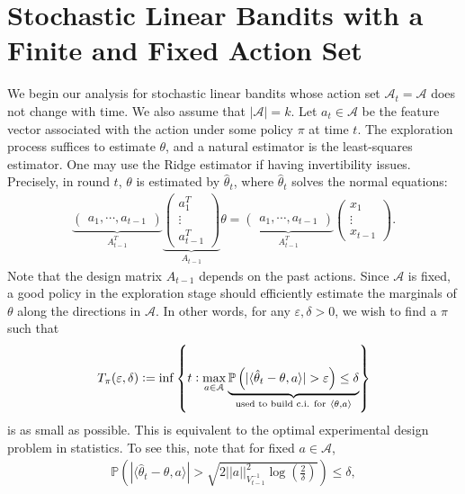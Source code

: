 \documentclass[letterpaper,11pt,openright,openany]{book}
\numberwithin{equation}{section}
\theoremstyle{plain}
\theoremstyle{definition}
\def\P{{\mathbb P}}
\def\e{{\varepsilon}}
\def\t{{\theta}}
\begin{document}
\section{Stochastic Linear Bandits with a Finite and Fixed Action Set}

We begin our analysis for stochastic linear bandits whose action set $\mathcal A_t = \mathcal A$ does not change with time. We also assume that $|\mathcal A|=k$. Let $a_t\in\mathcal A$ be the feature vector associated with the action under some policy $\pi$ at time $t$. The exploration process suffices to estimate $\t$, and a natural estimator is the least-squares estimator. One may use the Ridge estimator if having invertibility issues. Precisely, in round $t$, $\t$ is estimated by $\hat{\t}_t$, where $\hat{\t}_t $ solves the normal equations: 
\begin{align*}
\underbrace{\begin{pmatrix}
a_1, \cdots, a_{t-1}
\end{pmatrix}}_{A^T_{t-1}}\underbrace{\begin{pmatrix}
a_1^T \\
\vdots \\
a_{t-1}^T
\end{pmatrix}}_{A_{t-1}}\t = \underbrace{\begin{pmatrix}
a_1, \cdots, a_{t-1}
\end{pmatrix}}_{A^T_{t-1}}\begin{pmatrix}
x_1 \\
\vdots \\
x_{t-1}
\end{pmatrix}.
\end{align*}
Note that the design matrix $A_{t-1}$ depends on the past actions. Since $\mathcal A$ is fixed, a good policy in the exploration stage should efficiently estimate the marginals of $\t$ along the directions in $\mathcal A$. In other words, for any $\e, \delta>0$, we wish to find a $\pi$ such that 
\begin{align}
T_{\pi}(\e, \delta):=\inf\left\{t: \max_{a\in\mathcal A}\underbrace{\P\left(|\langle\hat{\t}_t-\t, a\rangle|>\e\right)\leq\delta}_{\textcolor{black}{\text{used to build c.i. for}\ \langle\t, a\rangle}}\right\}\label{sl:5}
\end{align}
is as small as possible. This is equivalent to the optimal experimental design problem in statistics. 
To see this, note that for fixed $a\in\mathcal A$, 
\begin{align*}
\P\left(|\langle\hat{\t}_t-\t, a\rangle|>\sqrt{2||a||^2_{V_{t-1}^{-1}}\log\left(\frac{2}{\delta}\right)}\right)\leq\delta,
\end{align*}
\end{document}
